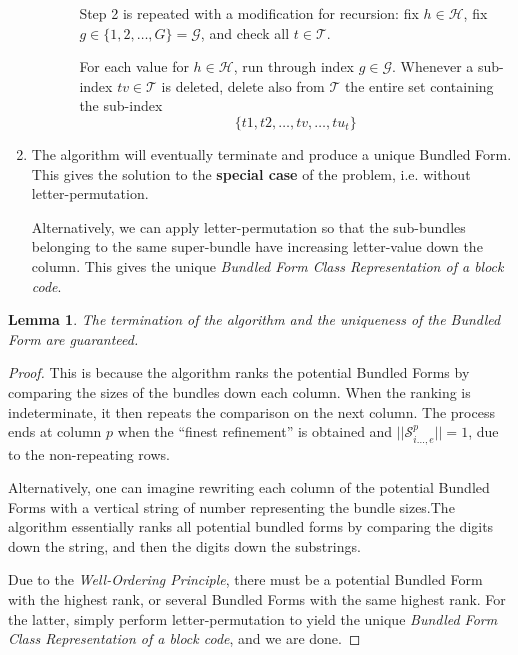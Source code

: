 \documentclass[12pt]{article}  %
\newtheorem{lemma}{Lemma}
\begin{document}
\begin{enumerate}
\begin{enumerate}
\begin{enumerate}
Step 2 is repeated with a modification for recursion: fix $h \in \mathcal{H}$, fix $g \in \{1,2,\dots,G\}=\mathcal{G}$, and check all $t \in \mathcal{T}$.


For each value for $h\in \mathcal{H}$, run through index $g \in \mathcal{G}$. Whenever a sub-index $tv \in \mathcal{T}$ is deleted, delete also from $\mathcal{T}$ the entire set containing the sub-index
$$\{t1, t2, \dots, tv, \dots, tu_t \}$$


\end{enumerate}


\end{enumerate}





\item The algorithm will eventually terminate and produce a unique Bundled Form. This gives the solution to the \textbf{special case} of the problem, i.e. without letter-permutation.

Alternatively, we can apply letter-permutation so that the sub-bundles belonging to the same super-bundle have increasing letter-value down the column. This gives the unique \emph{Bundled Form Class Representation of a block code}.


\end{enumerate}







\begin{lemma}\label{lem:uniq}
The termination of the algorithm and the uniqueness of the Bundled Form are guaranteed.
\end{lemma}
\begin{proof}
This is because the algorithm ranks the potential Bundled Forms by comparing the sizes of the bundles down each column. When the ranking is indeterminate, it then repeats the comparison on the next column. The process ends at column $p$ when the ``finest refinement'' is obtained and $||\mathcal{S}^{p}_{i \dots,e}||=1$, due to the non-repeating rows. 


Alternatively, one can imagine rewriting each column of the potential Bundled Forms with a vertical string of number representing the bundle sizes.The algorithm essentially ranks all potential bundled forms by comparing the digits down the string, and then the digits down the substrings.

Due to the \emph{Well-Ordering Principle}, there must be a potential Bundled Form with the highest rank, or several Bundled Forms with the same highest rank. For the latter, simply perform letter-permutation to yield the unique \emph{Bundled Form Class Representation of a block code}, and we are done.
\end{proof}
\end{document}
